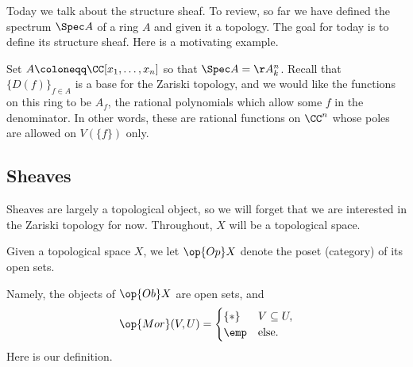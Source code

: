 \documentclass[../notes.tex]{subfiles}
\begin{document}
Today we talk about the structure sheaf. To review, so far we have defined the spectrum $\Spec A$ of a ring $A$ and given it a topology. The goal for today is to define its structure sheaf. Here is a motivating example.
\begin{example}
	Set $A\coloneqq\CC[x_1,\ldots,x_n]$ so that $\Spec A=\AA^n_k$. Recall that $\{D(f)\}_{f\in A}$ is a base for the Zariski topology, and we would like the functions on this ring to be $A_f$, the rational polynomials which allow some $f$ in the denominator. In other words, these are rational functions on $\CC^n$ whose poles are allowed on $V(\{f\})$ only.
\end{example}

\subsection{Sheaves}
Sheaves are largely a topological object, so we will forget that we are interested in the Zariski topology for now. Throughout, $X$ will be a topological space.
\begin{notation}
	Given a topological space $X$, we let $\op{Op}X$ denote the poset (category) of its open sets.
\end{notation}
Namely, the objects of $\op{Ob}X$ are open sets, and
\[\op{Mor}(V,U)=\begin{cases}
	\{*\} & V\subseteq U, \\
	\emp & \text{else}.
\end{cases}\]
Here is our definition.
\end{document}
